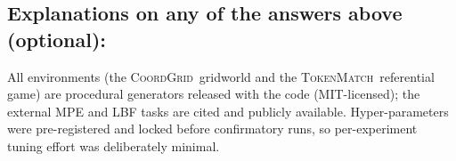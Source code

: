 \documentclass[manuscript, screen, review]{jair}
\newcommand{\coordgrid}{\textsc{CoordGrid}}
\newcommand{\tokenmatch}{\textsc{TokenMatch}}
\begin{document}
\subsection*{Explanations on any of the answers above (optional):}
All environments (the \coordgrid\ gridworld and the \tokenmatch\ referential game) are
procedural generators released with the code (MIT-licensed); the external MPE and LBF
tasks are cited and publicly available. Hyper-parameters were pre-registered and locked
before confirmatory runs, so per-experiment tuning effort was deliberately minimal.
\end{document}

